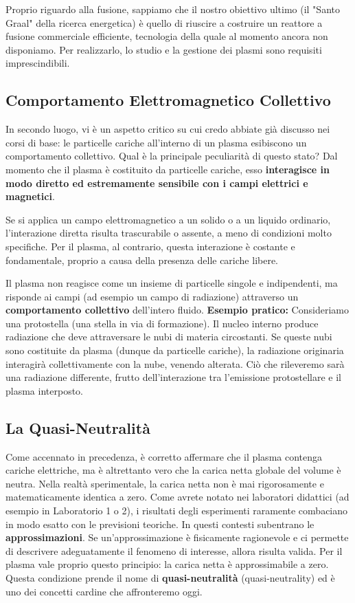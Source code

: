 Proprio riguardo alla fusione, sappiamo che il nostro obiettivo ultimo (il "Santo Graal" della ricerca energetica) è quello di riuscire a costruire un reattore a fusione commerciale efficiente, tecnologia della quale al momento ancora non disponiamo. Per realizzarlo, lo studio e la gestione dei plasmi sono requisiti imprescindibili.

    \subsection{Comportamento Elettromagnetico Collettivo}
    
    In secondo luogo, vi è un aspetto critico su cui credo abbiate già discusso nei corsi di base: le particelle cariche all'interno di un plasma esibiscono un comportamento collettivo.
    Qual è la principale peculiarità di questo stato? Dal momento che il plasma è costituito da particelle cariche, esso \textbf{interagisce in modo diretto ed estremamente sensibile con i campi elettrici e magnetici}.
    
    Se si applica un campo elettromagnetico a un solido o a un liquido ordinario, l'interazione diretta risulta trascurabile o assente, a meno di condizioni molto specifiche. Per il plasma, al contrario, questa interazione è costante e fondamentale, proprio a causa della presenza delle cariche libere.
    
    Il plasma non reagisce come un insieme di particelle singole e indipendenti, ma risponde ai campi (ad esempio un campo di radiazione) attraverso un \textbf{comportamento collettivo} dell'intero fluido.
    \textbf{Esempio pratico:} Consideriamo una protostella (una stella in via di formazione). Il nucleo interno produce radiazione che deve attraversare le nubi di materia circostanti. Se queste nubi sono costituite da plasma (dunque da particelle cariche), la radiazione originaria interagirà collettivamente con la nube, venendo alterata. Ciò che rileveremo sarà una radiazione differente, frutto dell'interazione tra l'emissione protostellare e il plasma interposto.
    
    \subsection{La Quasi-Neutralità}
    
    Come accennato in precedenza, è corretto affermare che il plasma contenga cariche elettriche, ma è altrettanto vero che la carica netta globale del volume è neutra.
    Nella realtà sperimentale, la carica netta non è mai rigorosamente e matematicamente identica a zero. Come avrete notato nei laboratori didattici (ad esempio in Laboratorio 1 o 2), i risultati degli esperimenti raramente combaciano in modo esatto con le previsioni teoriche. In questi contesti subentrano le \textbf{approssimazioni}. Se un'approssimazione è fisicamente ragionevole e ci permette di descrivere adeguatamente il fenomeno di interesse, allora risulta valida.
    Per il plasma vale proprio questo principio: la carica netta è approssimabile a zero. Questa condizione prende il nome di \textbf{quasi-neutralità} (quasi-neutrality) ed è uno dei concetti cardine che affronteremo oggi.
    
